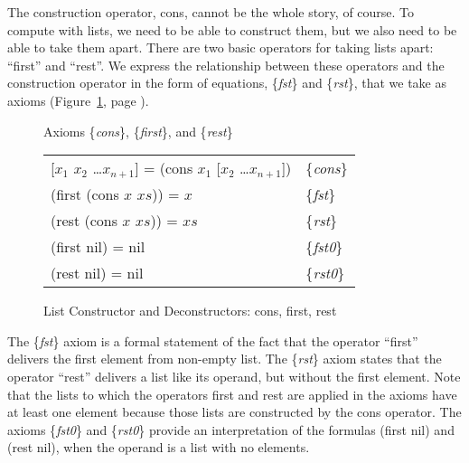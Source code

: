 The construction operator, cons, cannot be the whole story, of course.
To compute with lists, we  need to be able to construct them,
but we also need to be able to take them apart.
There are two basic operators for taking lists apart: ``first'' and ``rest''.
We express the relationship between these operators and
the construction operator in the form of equations,
\{\emph{fst}\} and \{\emph{rst}\}, that we take as axioms
(Figure~\ref{first-rest-cons}, page \pageref{first-rest-cons}).

\begin{figure}
\begin{center}
 Axioms \{\emph{cons}\}, \{\emph{first}\}, and \{\emph{rest}\} \\
\begin{tabular}{ll}
 [$x_1$ $x_2$ \dots $x_{n+1}$] = (cons $x_1$ [$x_2$ \dots $x_{n+1}$]) & \{\emph{cons}\} \\
 (first (cons $x$ $xs$)) = $x$                                        & \{\emph{fst}\}\\
 (rest (cons $x$ $xs$))  = $xs$                                       & \{\emph{rst}\} \\
 (first nil) = nil                                                    & \{\emph{fst0}\}\\
 (rest nil) = nil                                                     & \{\emph{rst0}\}
\end{tabular}
\end{center}
\caption{List Constructor and Deconstructors: cons, first, rest}
\label{first-rest-cons}
\end{figure}

The \{\emph{fst}\} axiom is a formal statement of the fact that
the operator ``first'' delivers the first element from non-empty list.
The \{\emph{rst}\} axiom states that the operator ``rest'' delivers
a list like its operand, but without the first element.
Note that the lists to which the operators first and rest
are applied in the axioms have at least one element
because those lists are constructed by the cons operator.
The axioms
\{\emph{fst0}\} and \{\emph{rst0}\}
provide an interpretation of the formulas (first nil) and (rest nil),
when the operand is a list with no elements.

